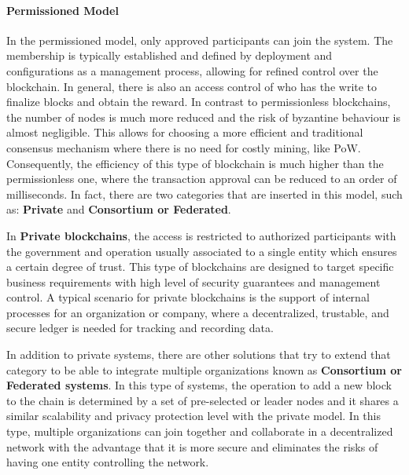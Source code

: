 
\paragraph{Permissioned Model}

In the permissioned model, only approved participants can join the system. The membership is typically established and defined by deployment and configurations as a management process, allowing for refined control over the blockchain. In general, there is also an access control of who has the write to finalize blocks and obtain the reward. In contrast to permissionless blockchains, the number of nodes is much more reduced and the risk of byzantine behaviour is almost negligible. This allows for choosing a more efficient and traditional consensus mechanism where there is no need for costly mining, like \gls{PoW}. Consequently, the efficiency of this type of blockchain is much higher than the permissionless one, where the transaction approval can be reduced to an order of milliseconds. In fact, there are two categories that are inserted in this model, such as: \textbf{Private} and \textbf{Consortium or Federated}.


In \textbf{Private blockchains}, the access is restricted to authorized participants with the government and operation usually associated to a single entity which ensures a certain degree of trust. This type of blockchains are designed to target specific business requirements with high level of security guarantees and management control. A typical scenario for private blockchains is the support of internal processes for an organization or company, where a decentralized, trustable, and secure ledger is needed for tracking and recording data.

In addition to private systems, there are other solutions that try to extend that category to be able to integrate multiple organizations known as \textbf{Consortium or Federated systems}. In this type of systems, the operation to add a new block to the chain is determined by a set of pre-selected or leader nodes and it shares a similar scalability and privacy protection level with the private model. In this type, multiple organizations can join together and collaborate in a decentralized network with the advantage that it is more secure and eliminates the risks of having one entity controlling the network. 


